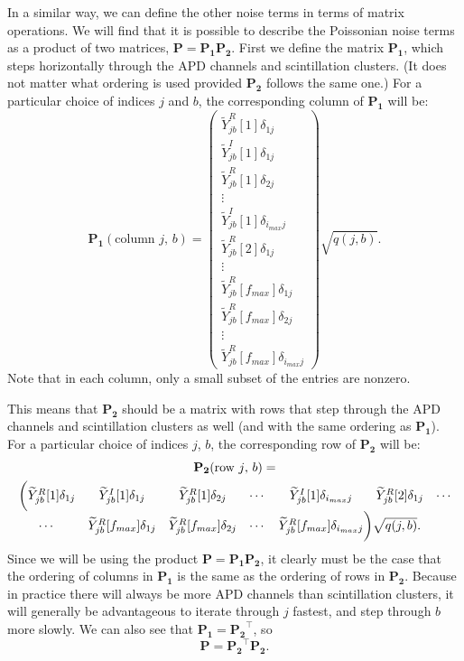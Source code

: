 In a similar way, we can define the other noise terms in terms of matrix operations.  We will find that it is possible to describe the Poissonian noise terms as a product of two matrices, $\mathbf{P = P_1 P_2}$.  First we define the matrix $\mathbf{P_1}$, which steps horizontally through the APD channels and scintillation clusters.  (It does not matter what ordering is used provided $\mathbf{P_2}$ follows the same one.)  For a particular choice of indices $j$ and $b$, the corresponding column of $\mathbf{P_1}$ will be:
\begin{equation}
\mathbf{P_1}(\text{column $j$, $b$}) = \begin{pmatrix}
\widetilde{Y}^R_{j b}[1] \delta_{1 j} \\
\widetilde{Y}^I_{j b}[1] \delta_{1 j} \\
\widetilde{Y}^R_{j b}[1] \delta_{2 j} \\
\vdots \\
\widetilde{Y}^I_{j b}[1] \delta_{i_{max} j} \\
\widetilde{Y}^R_{j b}[2] \delta_{1 j} \\
\vdots \\
\widetilde{Y}^R_{j b}[f_{max}] \delta_{1 j} \\
\widetilde{Y}^R_{j b}[f_{max}] \delta_{2 j} \\
\vdots \\
\widetilde{Y}^R_{j b}[f_{max}] \delta_{i_{max} j}
\end{pmatrix}\sqrt{q(j,b)}.
\end{equation}
Note that in each column, only a small subset of the entries are nonzero.

This means that $\mathbf{P_2}$ should be a matrix with rows that step through the APD channels and scintillation clusters as well (and with the same ordering as $\mathbf{P_1}$).  For a particular choice of indices $j$, $b$, the corresponding row of $\mathbf{P_2}$ will be:
\begin{multline} \mathbf{P_2}(\text{row $j$, $b$}) = \\
\begin{matrix}
\bigg( \widetilde{Y}^R_{jb}[1]\delta_{1 j} & \widetilde{Y}^I_{j b}[1]\delta_{1 j} & \widetilde{Y}^R_{jb}[1]\delta_{2 j} & \cdots & \widetilde{Y}^I_{jb}[1]\delta_{i_{max} j} & \widetilde{Y}^R_{jb}[2]\delta_{1 j} & \cdots \\
\cdots & \widetilde{Y}^R_{jb}[f_{max}]\delta_{1 j} & \widetilde{Y}^R_{jb}[f_{max}]\delta_{2 j} & \cdots & \widetilde{Y}^R_{jb}[f_{max}]\delta_{i_{max} j}\rlap{$\bigg) \sqrt{q(j,b)}.$}
\end{matrix}\end{multline}
Since we will be using the product $\mathbf{P} = \mathbf{P_1 P_2}$, it clearly must be the case that the ordering of columns in $\mathbf{P_1}$ is the same as the ordering of rows in $\mathbf{P_2}$.  Because in practice there will always be more APD channels than scintillation clusters, it will generally be advantageous to iterate through $j$ fastest, and step through $b$ more slowly.  We can also see that $\mathbf{P_1} = \mathbf{P_2}^{\top}$, so
\begin{equation}
\mathbf{P} = \mathbf{P_2}^{\top} \mathbf{P_2}.
\end{equation}

